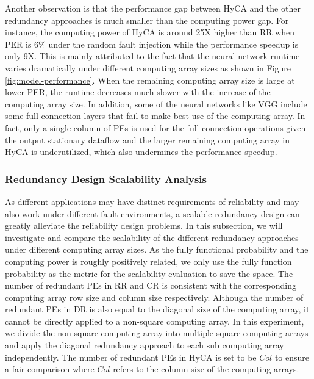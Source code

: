 Another observation is that the performance gap between HyCA and the other redundancy approaches is much smaller than the computing power gap. For instance, the computing power of HyCA is around 25X higher than RR when PER is 6\% under the random fault injection while the performance speedup is only 9X. This is mainly attributed to the fact that the neural network runtime varies dramatically under different computing array sizes as shown in Figure \ref{fig:model-performance}. When the remaining computing array size is large at lower PER, the runtime decreases much slower with the increase of the computing array size. In addition, some of the neural networks like VGG include some full connection layers that fail to make best use of the computing array. In fact, only a single column of PEs is used for the full connection operations given the output stationary dataflow and the larger remaining computing array in HyCA is underutilized, which also undermines the performance speedup.

\subsubsection{Redundancy Design Scalability Analysis}
As different applications may have distinct requirements of reliability and may also work under different fault environments, a scalable redundancy design can greatly alleviate the reliability design problems. In this subsection, we will investigate and compare the scalability of the different redundancy approaches under different computing array sizes. As the fully functional probability and the computing power is roughly positively related, we only use the fully function probability as the metric for the scalability evaluation to save the space. The number of redundant PEs in RR and CR is consistent with the corresponding computing array row size and column size respectively. Although the number of redundant PEs in DR is also equal to the diagonal size of the computing array, it cannot be directly applied to a non-square computing array. In this experiment, we divide the non-square computing array into multiple square computing arrays and apply the diagonal redundancy approach to each sub computing array independently. The number of redundant PEs in HyCA is set to be $Col$ to ensure a fair comparison where $Col$ refers to the column size of the computing arrays. 

